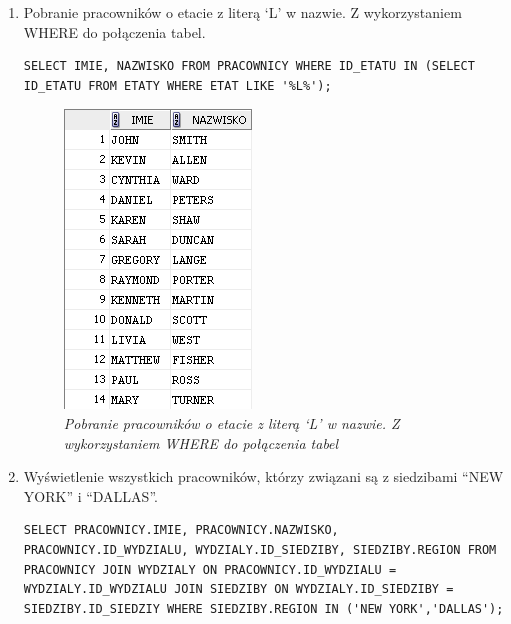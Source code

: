 \documentclass[a4paper, 10pt]{article}
\begin{document}
\begin{enumerate}
\newpage

\item Pobranie pracowników o etacie z literą `L' w nazwie. Z wykorzystaniem WHERE do połączenia tabel. 
\begin{lstlisting}[style=SQL, caption=\textit{Pobranie pracowników o etacie z literą `L' w nazwie. Z wykorzystaniem WHERE do połączenia tabel}]
SELECT IMIE, NAZWISKO FROM PRACOWNICY WHERE ID_ETATU IN (SELECT ID_ETATU FROM ETATY WHERE ETAT LIKE '%L%');
\end{lstlisting}

\begin{figure}[H]
	\centering
	\includegraphics[scale=0.7]{zadanie12.png}
	\caption{\textit{Pobranie pracowników o etacie z literą `L' w nazwie. Z wykorzystaniem WHERE do połączenia tabel}}
\end{figure}


\item Wyświetlenie wszystkich pracowników, którzy związani są z siedzibami ``NEW YORK'' i ``DALLAS''. 
\begin{lstlisting}[style=SQL, caption=\textit{Wyświetlenie wszystkich pracowników, którzy związani są z siedzibami ``NEW YORK'' i ``DALLAS''}]
SELECT PRACOWNICY.IMIE, PRACOWNICY.NAZWISKO, PRACOWNICY.ID_WYDZIALU, WYDZIALY.ID_SIEDZIBY, SIEDZIBY.REGION FROM PRACOWNICY JOIN WYDZIALY ON PRACOWNICY.ID_WYDZIALU = WYDZIALY.ID_WYDZIALU JOIN SIEDZIBY ON WYDZIALY.ID_SIEDZIBY = SIEDZIBY.ID_SIEDZIY WHERE SIEDZIBY.REGION IN ('NEW YORK','DALLAS');
\end{lstlisting}


\end{enumerate}
\end{document}
